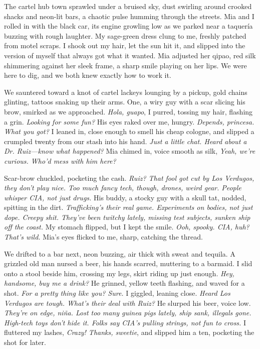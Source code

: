 \documentclass[12pt,oneside]{book}
\begin{document}
The cartel hub town sprawled under a bruised sky, dust swirling around crooked shacks and neon-lit bars, a chaotic pulse humming through the streets. Mia and I rolled in with the black car, its engine growling low as we parked near a taquería buzzing with rough laughter. My sage-green dress clung to me, freshly patched from motel scraps. I shook out my hair, let the sun hit it, and slipped into the version of myself that always got what it wanted. Mia adjusted her qipao, red silk shimmering against her sleek frame, a sharp smile playing on her lips. We were here to dig, and we both knew exactly how to work it.

We sauntered toward a knot of cartel lackeys lounging by a pickup, gold chains glinting, tattoos snaking up their arms. One, a wiry guy with a scar slicing his brow, smirked as we approached. \textit{Hola, guapo}, I purred, tossing my hair, flashing a grin. \textit{Looking for some fun?} His eyes raked over me, hungry. \textit{Depends, princesa. What you got?} I leaned in, close enough to smell his cheap cologne, and slipped a crumpled twenty from our stash into his hand. \textit{Just a little chat. Heard about a Dr. Ruiz—know what happened?} Mia chimed in, voice smooth as silk, \textit{Yeah, we’re curious. Who’d mess with him here?}

Scar-brow chuckled, pocketing the cash. \textit{Ruiz? That fool got cut by Los Verdugos, they don’t play nice. Too much fancy tech, though, drones, weird gear. People whisper CIA, not just drugs.} His buddy, a stocky guy with a skull tat, nodded, spitting in the dirt. \textit{Trafficking’s their real game. Experiments on bodies, not just dope. Creepy shit. They’ve been twitchy lately, missing test subjects, sunken ship off the coast.} My stomach flipped, but I kept the smile. \textit{Ooh, spooky. CIA, huh? That’s wild.} Mia’s eyes flicked to me, sharp, catching the thread.

We drifted to a bar next, neon buzzing, air thick with sweat and tequila. A grizzled old man nursed a beer, his hands scarred, muttering to a barmaid. I slid onto a stool beside him, crossing my legs, skirt riding up just enough. \textit{Hey, handsome, buy me a drink?} He grinned, yellow teeth flashing, and waved for a shot. \textit{For a pretty thing like you? Sure.} I giggled, leaning close. \textit{Heard Los Verdugos are tough. What’s their deal with Ruiz?} He slurped his beer, voice low. \textit{They’re on edge, niña. Lost too many guinea pigs lately, ship sank, illegals gone. High-tech toys don’t hide it. Folks say CIA’s pulling strings, not fun to cross.} I fluttered my lashes, \textit{Crazy! Thanks, sweetie}, and slipped him a ten, pocketing the shot for later.
\end{document}
